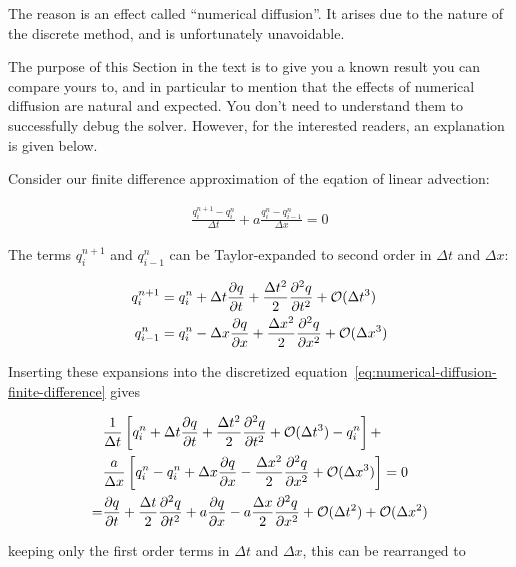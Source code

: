 The reason is an effect called ``numerical diffusion''. It arises due to the nature
of the discrete method, and is unfortunately unavoidable.

The purpose of this Section in the text is to give you a known result you can compare
yours to, and in particular to mention that the effects of numerical diffusion are
natural and expected. You don't need to understand them to successfully debug the solver.
However, for the interested readers, an explanation is given below.

Consider our finite difference approximation of the eqation of linear advection:

\begin{align}
    \frac{q_i^{n+1} - q_i^n}{\Delta t} + a\frac{q^{n}_{i} - q_{i-1}^n}{\Delta x} = 0
    \label{eq:numerical-diffusion-finite-difference}
\end{align}

The terms $q_i^{n+1}$ and $q_{i-1}^n$ can be Taylor-expanded to second order in $\Delta t$ and
$\Delta x$:

\begin{align}
    q_i^{n+1} &=
        q_i^n + \Delta t \frac{\partial q}{\partial t} +
        \frac{\Delta t^2}{2} \frac{\partial^2 q}{\partial t^2} + \mathcal{O}(\Delta t^3)
    \label{eq:taylor-un+1}\\
    q_{i-1}^{n} &=
        q_i^n - \Delta x \frac{\partial q}{\partial x} +
        \frac{\Delta x^2}{2} \frac{\partial^2 q}{\partial x^2} + \mathcal{O}(\Delta x^3)
    \label{eq:taylor-ui-1}
\end{align}


Inserting these expansions into the discretized
equation~\ref{eq:numerical-diffusion-finite-difference} gives

\begin{align}
   & \frac{1}{\Delta t} \left[
        q_i^n + \Delta t \frac{\partial q}{\partial t} +
        \frac{\Delta t^2}{2} \frac{\partial^2 q}{\partial t^2} + \mathcal{O}(\Delta t^3) - q_i^n
   \right] + \nonumber \\
   & \frac{a}{\Delta x} \left[
        q_i^n - q_i^n + \Delta x \frac{\partial q}{\partial x} -
        \frac{\Delta x^2}{2} \frac{\partial^2 q}{\partial x^2} + \mathcal{O}(\Delta x^3)
   \right] = 0 \\
   = & \frac{\partial q}{\partial t} + \frac{\Delta t}{2} \frac{\partial^2 q}{\partial t^2}
   + a \frac{\partial q}{\partial x} - a \frac{\Delta x}{2} \frac{\partial^2 q}{\partial x^2}
    + \mathcal{O}(\Delta t^2) + \mathcal{O}(\Delta x^2)
\end{align}

keeping only the first order terms in $\Delta t$ and $\Delta x$, this can be rearranged to

